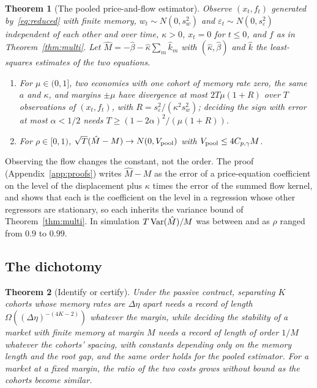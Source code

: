 \documentclass[12pt]{article}
\newtheorem{theorem}{Theorem}
\theoremstyle{definition}
\theoremstyle{remark}
\begin{document}
\begin{theorem}[The pooled price-and-flow estimator]\label{thm:pooled}
Observe $(x_t,f_t)$ generated by~\eqref{eq:reduced} with finite memory, $w_t\sim N(0,s_w^2)$ and $\varepsilon_t\sim N(0,s_\varepsilon^2)$ independent of each other and over time, $\kappa>0$, $x_t=0$ for $t\le0$, and $f$ as in Theorem~\ref{thm:multi}. Let $\hat M=-\hat\beta-\hat\kappa\sum_m\hat k_m$ with $(\hat\kappa,\hat\beta)$ and $\hat k$ the least-squares estimates of the two equations.
\begin{enumerate}[label=(\roman*)]
\item For $\mu\in(0,1]$, two economies with one cohort of memory rate zero, the same $a$ and $\kappa$, and margins $\pm\mu$ have divergence at most $2T\mu(1+R)$ over $T$ observations of $(x_t,f_t)$, with $R=s_\varepsilon^2/(\kappa^2s_w^2)$; deciding the sign with error at most $\alpha<1/2$ needs $T\ge(1-2\alpha)^2/(\mu(1+R))$.
\item For $\rho\in[0,1)$, $\sqrt T(\hat M-M)\to N(0,V_{\rm pool})$ with $V_{\rm pool}\le4C_{p,\gamma}M$.
\end{enumerate}
\end{theorem}

Observing the flow changes the constant, not the order. The proof (Appendix~\ref{app:proofs}) writes $\hat M-M$ as the error of a price-equation coefficient on the level of the displacement plus $\kappa$ times the error of the summed flow kernel, and shows that each is the coefficient on the level in a regression whose other regressors are stationary, so each inherits the variance bound of Theorem~\ref{thm:multi}. In simulation $T\,{\rm Var}(\hat M)/M$ was between \PooledRatioLo{} and \PooledRatioHi{} as $\rho$ ranged from $0.9$ to $0.99$.

\subsection{The dichotomy}

\begin{theorem}[Identify or certify]\label{thm:dichotomy}
Under the passive contract, separating $K$ cohorts whose memory rates are $\Delta\eta$ apart needs a record of length $\Omega((\Delta\eta)^{-(4K-2)})$ whatever the margin, while deciding the stability of a market with finite memory at margin $M$ needs a record of length of order $1/M$ whatever the cohorts' spacing, with constants depending only on the memory length and the root gap, and the same order holds for the pooled estimator. For a market at a fixed margin, the ratio of the two costs grows without bound as the cohorts become similar.
\end{theorem}
\end{document}
